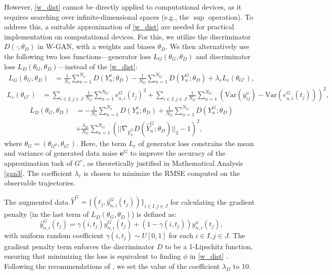 \documentclass[letterpaper]{article} %
\theoremstyle{thmstyleone}%
\theoremstyle{thmstyletwo}%
\theoremstyle{thmstylethree}%
\begin{document}
However, \cref{w_dist} cannot be directly applied to computational devices, as it requires searching over infinite-dimensional spaces (e.g., the $\sup$ operation). To address this, a suitable approximation of \cref{w_dist} are needed for practical implementation on computational devices. For this, we utilize the discriminator $D(\cdot;\theta_{D})$ in W-GAN, with a weights and biases $\theta_{D}$. We then alternatively use the following two loss functions---generator loss $L_{G}(\theta_{G},\theta_{D})$ and discriminator loss $L_{D}(\theta_{G},\theta_{D})$---instead of the \cref{w_dist}: 
\begin{align}
\displaystyle L_{G}(\theta_{G},\theta_{D}) & = \frac{1}{N_{o}}\sum_{n=1}^{N_{o}}D(Y_{n}^{o};\theta_{D})\nonumber - \frac{1}{N_{G}}\sum_{n=1}^{N_{G}}D(Y_{n}^{G};\theta_{D}) + \lambda_{e}L_{e}(\theta_{G^{e}}), \end{align}\begin{align}
\displaystyle
L_{e}(\theta_{G^{e}}) &= \sum_{i \in I, j \in J }\frac{1}{N_{G}}\sum_{n=1}^{N_{G}}e_{n,i}^{G}(t_{j})^{2} + \sum_{i \in I, j \in J }\frac{1}{N_{G}}\sum_{n=1}^{N_{G}}(\text{Var}(y_{ij}^{o}) - \text{Var}(e_{n,i}^{G}(t_{j})))^{2},\nonumber
\end{align}
\begin{align}
\displaystyle L_{D}(\theta_{G},\theta_{D}) & = -\frac{1}{N_{o}}\sum_{n=1}^{N_{o}}D(Y_{n}^{o};\theta_{D})\nonumber + \frac{1}{N_{G}}\sum_{n=1}^{N_{G}}D(Y_{n}^{G};\theta_{D}) \\
& + \frac{\lambda_{D} }{N_{G}}\sum_{n=1}^{N_{G}}(||\nabla_{\hat{Y}_{n}^{G}}D(\hat{Y}_{n}^{G};\theta_{D})||_{2}-1)^{2},\nonumber
\end{align}
where $\theta_{G} = (\theta_{G^{p}},\theta_{G^{e}})$. Here,  the term $L_{e}$ of generator loss constrains the mean and variance of generated data noise $\mathbf{e}^{G}$ to improve the accuracy of the approximation task of  $G^{e}$, as theoretically justified in Mathematical Analysis \cref{gan3}. The coefficient $\lambda_{e}$ is chosen to minimize the RMSE computed on the observable trajectories.

The augmented data $\displaystyle \hat{Y}^{G}=\{(t_{j},\hat{y}_{n,i}^{G}(t_{j}))\}_{i \in I, j \in J}$ for calculating the gradient penalty (in the last term of $\displaystyle L_{D}(\theta_{G},\theta_{D})$) is defined as:
$$
\displaystyle \hat{y}_{n,i}^{G}(t_{j}) = \gamma(i,t_{j})y_{n,i}^{G}(t_{j}) + (1-\gamma(i,t_{j})) y_{n,i}^{o}(t_{j}),
$$
with uniform random coefficient $\gamma(i,t_{j}) \sim U[0,1]$ for each $i \in I, j \in J$. The gradient penalty term enforces the discriminator $D$ to be a 1-Lipschitz function, ensuring that minimizing the loss is equivalent to finding $\phi$ in \cref{w_dist} \citep{gulrajani2017improved}. Following the recommendations of \citep{gulrajani2017improved}, we set the value of the coefficient $\lambda_{D}$ to 10.
\end{document}
